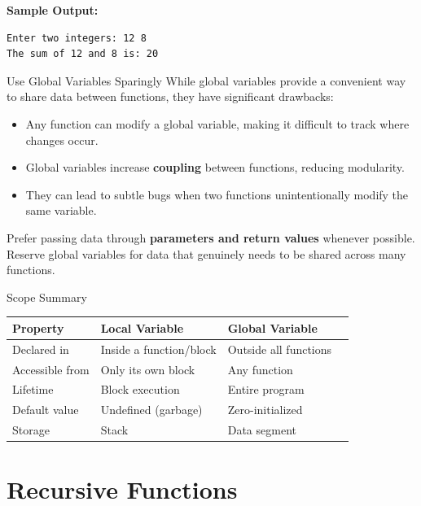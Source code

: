 \noindent\textbf{Sample Output:}
\begin{verbatim}
Enter two integers: 12 8
The sum of 12 and 8 is: 20
\end{verbatim}

\begin{warningbox}{Use Global Variables Sparingly}
While global variables provide a convenient way to share data between
functions, they have significant drawbacks:
\begin{itemize}
    \item Any function can modify a global variable, making it difficult to
          track where changes occur.
    \item Global variables increase \textbf{coupling} between functions,
          reducing modularity.
    \item They can lead to subtle bugs when two functions unintentionally
          modify the same variable.
\end{itemize}
Prefer passing data through \textbf{parameters and return values} whenever
possible. Reserve global variables for data that genuinely needs to be
shared across many functions.
\end{warningbox}

\begin{conceptbox}{Scope Summary}
\begin{center}
\renewcommand{\arraystretch}{1.3}
\begin{tabular}{@{}llll@{}}
\toprule
\textbf{Property} & \textbf{Local Variable}
    & \textbf{Global Variable} \\
\midrule
Declared in      & Inside a function/block
    & Outside all functions \\
Accessible from  & Only its own block
    & Any function \\
Lifetime         & Block execution
    & Entire program \\
Default value    & Undefined (garbage)
    & Zero-initialized \\
Storage          & Stack
    & Data segment \\
\bottomrule
\end{tabular}
\end{center}
\end{conceptbox}

\section{Recursive Functions}
\label{sec:recursive-functions}

